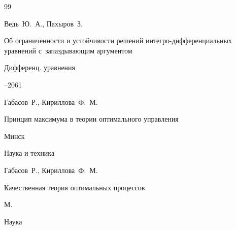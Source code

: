 \begin{thebibliography}{99}













\by Ведь~Ю.~А., Пахыров~З.

\paper Об ограниченности и устойчивости решений интегро-дифференциальных уравнений с~запаздывающим аргументом

\jour Дифференц. уравнения




--2061







\by Габасов~Р., Кириллова~Ф.~М.

\book Принцип максимума в теории оптимального управления

\publaddr Минск

\publ  Наука и техника








\by Габасов~Р., Кириллова~Ф.~М.

\book Качественная теория оптимальных процессов

\publaddr М.

\publ  Наука









\end{thebibliography}
